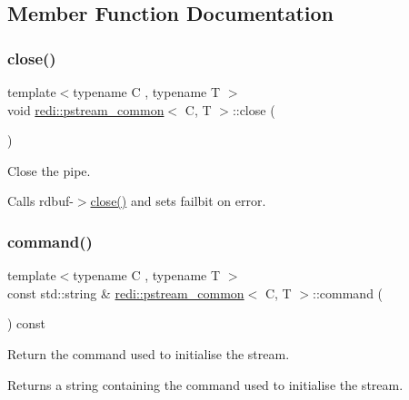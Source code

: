 \subsection{Member Function Documentation}
\mbox{\label{classredi_1_1pstream__common_ab06458ed9aea84a33489f05ec8ed0899}} 
\subsubsection{\texorpdfstring{close()}{close()}}
{\footnotesize\ttfamily template$<$typename C , typename T $>$ \\
void \mbox{\hyperlink{classredi_1_1pstream__common}{redi\+::pstream\+\_\+common}}$<$ C, T $>$\+::close (\begin{DoxyParamCaption}{ }\end{DoxyParamCaption})\hspace{0.3cm}{\ttfamily [inline]}}



Close the pipe. 

Calls rdbuf-\/$>$\mbox{\hyperlink{classredi_1_1pstream__common_ab06458ed9aea84a33489f05ec8ed0899}{close()}} and sets {\ttfamily failbit} on error.\mbox{\label{classredi_1_1pstream__common_acc3ad87315e0bce58714314b303b4b53}} 
\subsubsection{\texorpdfstring{command()}{command()}}
{\footnotesize\ttfamily template$<$typename C , typename T $>$ \\
const std\+::string \& \mbox{\hyperlink{classredi_1_1pstream__common}{redi\+::pstream\+\_\+common}}$<$ C, T $>$\+::command (\begin{DoxyParamCaption}{ }\end{DoxyParamCaption}) const\hspace{0.3cm}{\ttfamily [inline]}}



Return the command used to initialise the stream. 

\begin{DoxyReturn}{Returns}
a string containing the command used to initialise the stream. 
\end{DoxyReturn}
\mbox{\label{classredi_1_1pstream__common_a2505ab3e3a834b92d98b5bcb97734dfe}} 

